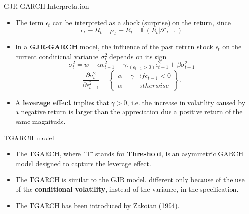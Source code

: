 \documentclass{beamer}
\def\Esp{\mathbb{E}}
\def\F{\mathcal{F}}
\newcommand{\imfbold}[1]{\textbf{\textcolor{imfblue}{#1}}}
\begin{document}
\begin{frame}{GJR-GARCH Interpretation}
    \begin{itemize}
        \item The term $\epsilon_t$ can be interpreted as a shock (surprise) on the return, since
        $$\epsilon_t = R_t - \mu_t = R_t - \Esp(R_t|\F_{t-1})$$
        \item In a \textbf{GJR-GARCH} model, the influence of the past return shock $\epsilon_t$ on the current conditional variance $\sigma_t^2$ depends on its sign
        $$\sigma_t^2 = w+\alpha\epsilon_{t-1}^2 + \gamma \mathbb{I}_{(\epsilon_{t-1}>0)}\epsilon_{t-1}^2 + \beta \sigma_{t-1}^2$$
        $$\frac{\partial\sigma_t^2}{\partial\epsilon_{t-1}^2} = \left\{
        \begin{matrix}
                         \alpha + \gamma & if \epsilon_{t-1} <0\\ 
                         \alpha & otherwise
        \end{matrix}
        \right\}.$$
        \item A \imfbold{leverage effect} implies that $\gamma > 0$, i.e. the increase in volatility caused by a negative return is larger than the appreciation due a positive return of the same magnitude.
    \end{itemize}
\end{frame}

\begin{frame}{TGARCH model}
\begin{itemize}
    \item The TGARCH, where "T" stands for \imfbold{Threshold}, is an asymmetric GARCH model designed to capture the leverage effect.
    \item The TGARCH is similar to the GJR model, different only because of the use of the \imfbold{conditional volatility}, instead of the variance, in the specification.
    \item The TGARCH has been introduced by Zakoian (1994).
\end{itemize} 
\end{frame}
\end{document}

